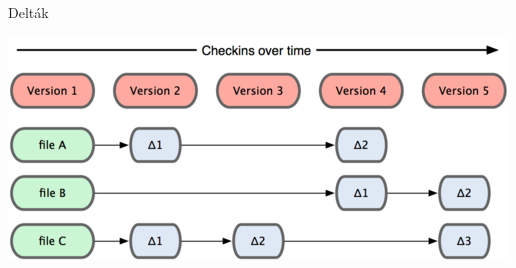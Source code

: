 
\begin{frame}{Delták}
    \begin{center}
        \includegraphics{frames/diagrams/deltas.png}
    \end{center}
\end{frame}

